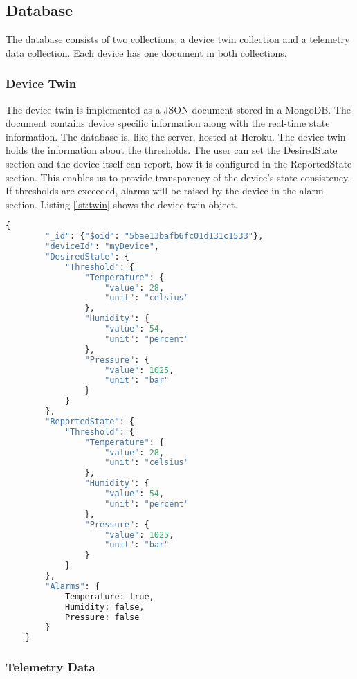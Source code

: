 \subsection{Database}
The database consists of two collections; a device twin collection and a telemetry data collection. Each device has one document in both collections.
\subsubsection*{Device Twin}
The device twin is implemented as a JSON document stored in a MongoDB. The document contains device specific information along with the real-time state information. The database is, like the server, hosted at Heroku. The device twin holds the information about the thresholds. The user can set the DesiredState section and the device itself can report, how it is configured in the ReportedState section. This enables us to provide transparency of the device's state consistency. If thresholds are exceeded, alarms will be raised by the device in the alarm section. Listing \ref{lst:twin} shows the device twin object.
\begin{lstlisting}[language=Python, caption=Device Twin, label={lst:twin}, basicstyle=\scriptsize]
    {
        "_id": {"$oid": "5bae13bafb6fc01d131c1533"}, 
        "deviceId": "myDevice", 
        "DesiredState": {
            "Threshold": {
                "Temperature": {
                    "value": 28, 
                    "unit": "celsius"
                }, 
                "Humidity": {
                    "value": 54, 
                    "unit": "percent"
                }, 
                "Pressure": {
                    "value": 1025, 
                    "unit": "bar"
                }
            }
        }, 
        "ReportedState": {
            "Threshold": {
                "Temperature": {
                    "value": 28, 
                    "unit": "celsius"
                }, 
                "Humidity": {
                    "value": 54, 
                    "unit": "percent"
                }, 
                "Pressure": {
                    "value": 1025, 
                    "unit": "bar"
                }
            }
        }, 
        "Alarms": {
            Temperature: true,
            Humidity: false,
            Pressure: false
        }
    } 
\end{lstlisting}

\subsubsection*{Telemetry Data}

